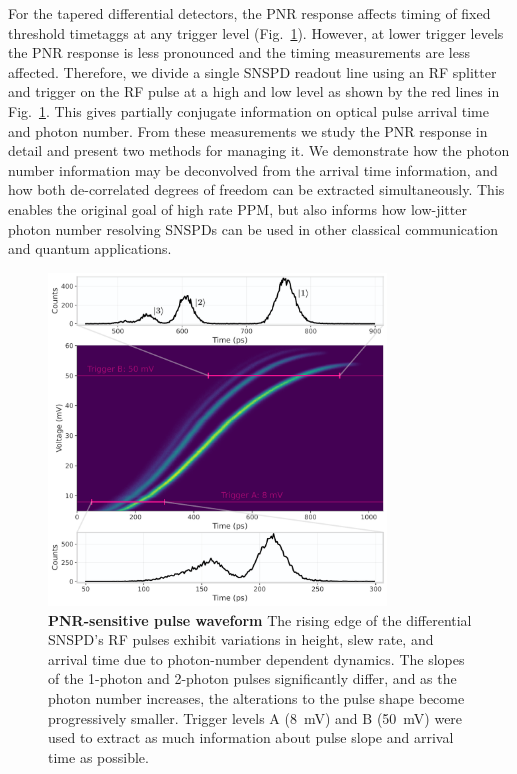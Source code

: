 \documentclass[11pt]{caltech_thesis} %
\begin{document}
For the tapered differential detectors, the PNR response affects timing of fixed threshold timetaggs at any trigger level (Fig.~\ref{fig:waveform}). However, at lower trigger levels the PNR response is less pronounced and the timing measurements are less affected. Therefore, we divide a single SNSPD readout line using an RF splitter and trigger on the RF pulse at a high and low level as shown by the red lines in Fig.~\ref{fig:waveform}. This gives partially conjugate information on optical pulse arrival time and photon number. From these measurements we study the PNR response in detail and present two methods for managing it. We demonstrate how the photon number information may be deconvolved from the arrival time information, and how both de-correlated degrees of freedom can be extracted simultaneously. This enables the original goal of high rate PPM, but also informs how low-jitter photon number resolving SNSPDs can be used in other classical communication and quantum applications.

\hypertarget{fig:waveform}{%
\begin{figure}
\centering
\includegraphics[width=0.8\textwidth,height=\textheight]{./chapter_04/figs/waveform_light.pdf}
\caption[{PNR-sensitive pulse waveform}]{\textbf{PNR-sensitive pulse waveform} The rising edge of the differential SNSPD's RF pulses exhibit variations in height, slew rate, and arrival time due to photon-number dependent dynamics. The slopes of the 1-photon and 2-photon pulses significantly differ, and as the photon number increases, the alterations to the pulse shape become progressively smaller. Trigger levels A (8~mV) and B (50~mV) were used to extract as much information about pulse slope and arrival time as possible.}
\label{fig:waveform}
\end{figure}
}
\end{document}
